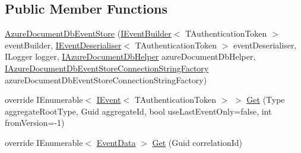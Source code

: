 \subsection*{Public Member Functions}
\begin{DoxyCompactItemize}
\item 
\hyperlink{classCqrs_1_1Azure_1_1DocumentDb_1_1Events_1_1AzureDocumentDbEventStore_a0bbf294600f2dcebfcca28143aacd430_a0bbf294600f2dcebfcca28143aacd430}{Azure\+Document\+Db\+Event\+Store} (\hyperlink{interfaceCqrs_1_1Events_1_1IEventBuilder}{I\+Event\+Builder}$<$ T\+Authentication\+Token $>$ event\+Builder, \hyperlink{interfaceCqrs_1_1Events_1_1IEventDeserialiser}{I\+Event\+Deserialiser}$<$ T\+Authentication\+Token $>$ event\+Deserialiser, I\+Logger logger, \hyperlink{interfaceCqrs_1_1Azure_1_1DocumentDb_1_1IAzureDocumentDbHelper}{I\+Azure\+Document\+Db\+Helper} azure\+Document\+Db\+Helper, \hyperlink{interfaceCqrs_1_1Azure_1_1DocumentDb_1_1Events_1_1IAzureDocumentDbEventStoreConnectionStringFactory}{I\+Azure\+Document\+Db\+Event\+Store\+Connection\+String\+Factory} azure\+Document\+Db\+Event\+Store\+Connection\+String\+Factory)
\item 
override I\+Enumerable$<$ \hyperlink{interfaceCqrs_1_1Events_1_1IEvent}{I\+Event}$<$ T\+Authentication\+Token $>$ $>$ \hyperlink{classCqrs_1_1Azure_1_1DocumentDb_1_1Events_1_1AzureDocumentDbEventStore_a54f298fdde141166e23f01e4911bf188_a54f298fdde141166e23f01e4911bf188}{Get} (Type aggregate\+Root\+Type, Guid aggregate\+Id, bool use\+Last\+Event\+Only=false, int from\+Version=-\/1)
\item 
override I\+Enumerable$<$ \hyperlink{classCqrs_1_1Events_1_1EventData}{Event\+Data} $>$ \hyperlink{classCqrs_1_1Azure_1_1DocumentDb_1_1Events_1_1AzureDocumentDbEventStore_ac59ce599b768ce047869b8ac135f4e22_ac59ce599b768ce047869b8ac135f4e22}{Get} (Guid correlation\+Id)
\end{DoxyCompactItemize}
